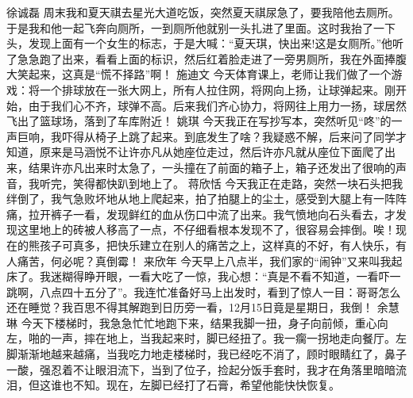 {}\markdownRendererInterblockSeparator
{}徐诚磊\markdownRendererInterblockSeparator
{}周末我和夏天祺去星光大道吃饭，突然夏天祺尿急了，要我陪他去厕所。于是我和他一起飞奔向厕所，一到厕所他就别一头扎进了里面。这时我抬了一下头，发现上面有一个女生的标志，于是大喊：“夏天琪，快出来!这是女厕所。”他听了急急跑了出来，看看上面的标识，然后红着脸走进了一旁男厕所，我在外面捧腹大笑起来，这真是“慌不择路”啊！\markdownRendererInterblockSeparator
{}\markdownRendererInterblockSeparator
{}施迪文\markdownRendererInterblockSeparator
{}今天体育课上，老师让我们做了一个游戏：将一个排球放在一张大网上，所有人拉住网，将网向上扬，让球弹起来。刚开始，由于我们心不齐，球弹不高。后来我们齐心协力，将网往上用力一扬，球居然飞出了篮球场，落到了车库附近！\markdownRendererInterblockSeparator
{}\markdownRendererInterblockSeparator
{}姚琪\markdownRendererInterblockSeparator
{}今天我正在写抄写本，突然听见“咚”的一声巨响，我吓得从椅子上跳了起来。到底发生了啥？我疑惑不解，后来问了同学才知道，原来是马涵悦不让许亦凡从她座位走过，然后许亦凡就从座位下面爬了出来，结果许亦凡出来时太急了，一头撞在了前面的箱子上，箱子还发出了很响的声音，我听完，笑得都快趴到地上了。\markdownRendererInterblockSeparator
{}\markdownRendererInterblockSeparator
{}蒋欣恬\markdownRendererInterblockSeparator
{}今天我正在走路，突然一块石头把我绊倒了，我气急败坏地从地上爬起来，拍了拍腿上的尘土，感受到大腿上有一阵阵痛，拉开裤子一看，发现鲜红的血从伤口中流了出来。我气愤地向石头看去，才发现这里地上的砖被人移高了一点，不仔细看根本发现不了，很容易会摔倒。唉！现在的熊孩子可真多，把快乐建立在别人的痛苦之上，这样真的不好，有人快乐，有人痛苦，何必呢？真倒霉！\markdownRendererInterblockSeparator
{}\markdownRendererInterblockSeparator
{}来欣年\markdownRendererInterblockSeparator
{}今天早上八点半，我们家的“闹钟”又来叫我起床了。我迷糊得睁开眼，一看大吃了一惊，我心想：“真是不看不知道，一看吓一跳啊，八点四十五分了”。我连忙准备好马上出发时，看到了惊人一目：哥哥怎么还在睡觉？我百思不得其解跑到日历旁一看，12月15日竟是星期日，我倒！\markdownRendererInterblockSeparator
{}\markdownRendererInterblockSeparator
{}余慧琳\markdownRendererInterblockSeparator
{}今天下楼梯时，我急急忙忙地跑下来，结果我脚一扭，身子向前倾，重心向左，啪的一声，摔在地上，当我起来时，脚已经扭了。我一瘸一拐地走向餐厅。左脚渐渐地越来越痛，当我吃力地走楼梯时，我已经吃不消了，顾时眼睛红了，鼻子一酸，强忍着不让眼泪流下，当到了位子，捡起分饭手套时，我才在角落里暗暗流泪，但这谁也不知。现在，左脚已经打了石膏，希望他能快快恢复。\markdownRendererInterblockSeparator
